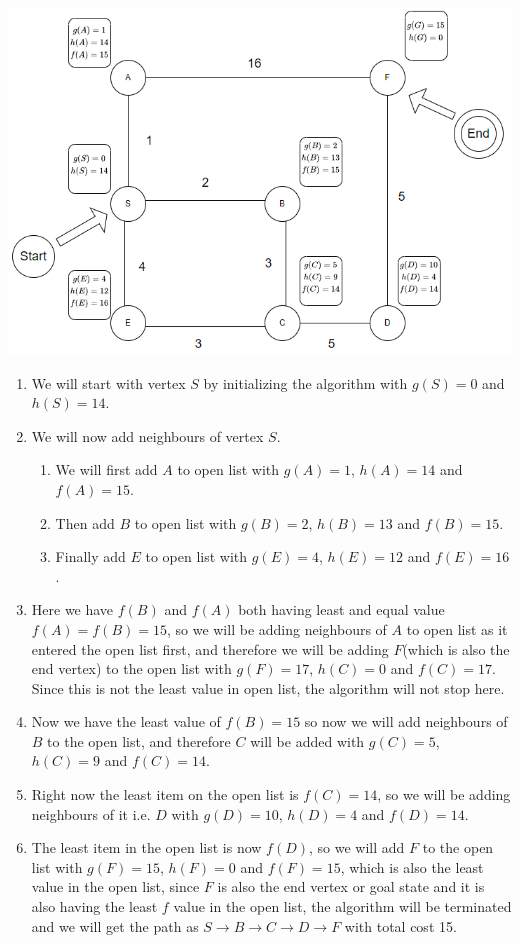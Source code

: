 \documentclass{article}
\theoremstyle{definition}
\begin{document}
\begin{center}
    \includegraphics[width=\linewidth]{DryRun-3.png}
\end{center}
\begin{enumerate}
    \item We will start with vertex $S$ by initializing the algorithm with $g(S) = 0$ and $h(S) = 14$.
    \item We will now add neighbours of vertex $S$.
    \begin{enumerate}
        \item We will first add $A$ to open list with $g(A) = 1$, $h(A) = 14$ and $f(A) = 15$. \item Then add $B$ to open list with $g(B) = 2$, $h(B) = 13$ and $f(B) = 15$.
        \item Finally add $E$ to open list with $g(E) = 4$, $h(E) = 12$ and $f(E) = 16$.
    \end{enumerate}
    \item Here we have $f(B)$ and $f(A)$ both having least and equal value $f(A) = f(B) = 15$, so we will be adding neighbours of $A$ to open list as it entered the open list first, and therefore we will be adding $F$(which is also the end vertex) to the open list with $g(F) = 17$, $h(C) = 0$ and $f(C) = 17$. Since this is not the least value in open list, the algorithm will not stop here.
    \item Now we have the least value of $f(B) = 15$ so now we will add neighbours of $B$ to the open list, and therefore $C$ will be added with $g(C) = 5$, $h(C) = 9$ and $f(C) = 14$.
    \item Right now the least item on the open list is $f(C) = 14$, so we will be adding neighbours of it i.e. $D$ with $g(D) = 10$, $h(D) = 4$ and $f(D) = 14$.
    \item The least item in the open list is now $f(D)$, so we will add $F$ to the open list with $g(F) = 15$, $h(F) = 0$ and $f(F) = 15$, which is also the least value in the open list, since $F$ is also the end vertex or goal state and it is also having the least $f$ value in the open list, the algorithm will be terminated and we will get the path as $S \longrightarrow B \longrightarrow C \longrightarrow D \longrightarrow F$ with total cost 15.
\end{enumerate}
\end{document}
